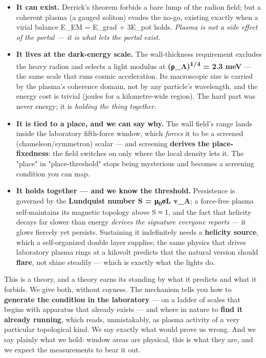 \documentclass[11pt]{article}
\begin{document}
\begin{itemize}
\item \textbf{It can exist.} Derrick's theorem forbids a bare lump of the radion field; but a coherent plasma (a gauged soliton) evades the no-go, existing exactly when a virial balance E\_EM = E\_grad + 3E\_pot holds. \emph{Plasma is not a side effect of the portal --- it is what lets the portal exist.}
\item \textbf{It lives at the dark-energy scale.} The wall-thickness requirement excludes the heavy radion and selects a light modulus at \textbf{(ρ\_Λ)\textsuperscript{1/4} = 2.3 meV} --- the same scale that runs cosmic acceleration. Its macroscopic size is carried by the plasma's coherence domain, not by any particle's wavelength, and the energy cost is trivial (joules for a kilometre-wide region). The hard part was never energy; it is \emph{holding the thing together.}
\item \textbf{It is tied to a place, and we can say why.} The wall field's range lands inside the laboratory fifth-force window, which \emph{forces} it to be a screened (chameleon/symmetron) scalar --- and screening \textbf{derives the place-fixedness}: the field switches on only where the local density lets it. The "place" in "place-threshold" stops being mysterious and becomes a screening condition you can map.
\item \textbf{It holds together --- and we know the threshold.} Persistence is governed by the \textbf{Lundquist number S = μ\textsubscript{0}σL v\_A}; a force-free plasma self-maintains its magnetic topology above S ≈ 1, and the fact that helicity decays far slower than energy \emph{derives the signature everyone reports} --- it glows fiercely yet persists. Sustaining it indefinitely needs a \textbf{helicity source}, which a self-organized double layer supplies; the same physics that drives laboratory plasma rings at a kilovolt predicts that the natural version should \textbf{flare}, not shine steadily --- which is exactly what the lights do.
\end{itemize}

This is a theory, and a theory earns its standing by what it predicts and what it forbids. We give both, without coyness. The mechanism tells you how to \textbf{generate the condition in the laboratory} --- on a ladder of scales that begins with apparatus that already exists --- and where in nature to \textbf{find it already running}, which reads, unmistakably, as plasma activity of a very particular topological kind. We say exactly what would prove us wrong. And we say plainly what we hold: window areas are physical, this is what they are, and we expect the measurements to bear it out.
\end{document}
